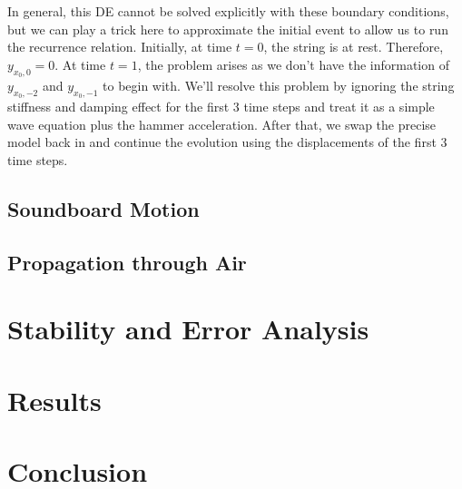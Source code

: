 \documentclass[a4paper,12pt]{article}
\begin{document}
		In general, this DE cannot be solved explicitly with these boundary conditions, but we can play a trick here to approximate the initial event to allow us to run the recurrence relation. Initially, at time $t = 0$, the string is at rest. Therefore, $y_{x_0,0} = 0$. At time $t = 1$, the problem arises as we don't have the information of $y_{x_0,-2}$ and $y_{x_0,-1}$ to begin with. We'll resolve this problem by ignoring the string stiffness and damping effect for the first 3 time steps and treat it as a simple wave equation plus the hammer acceleration. After that, we swap the precise model back in and continue the evolution using the displacements of the first 3 time steps.

\subsection*{Soundboard Motion}


\subsection*{Propagation through Air}

\section*{Stability and Error Analysis}
		
\section*{Results}

\section*{Conclusion}
\end{document}
